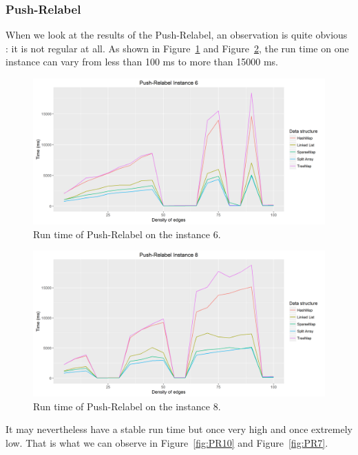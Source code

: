 \subsubsection{Push-Relabel}
When we look at the results of the Push-Relabel, an observation is quite obvious : it is not regular at all. As shown in Figure~\ref{fig:PR6} and Figure~\ref{fig:PR8}, the run time on one instance can vary from less than 100 ms to more than 15000 ms.

\begin{figure}[H]
\includegraphics[scale=0.5]{images/PR6.png}
\caption{Run time of Push-Relabel on the instance 6.}
\label{fig:PR6}
\end{figure}
\begin{figure}[H]
\includegraphics[scale=0.5]{images/PR8.png}
\caption{Run time of Push-Relabel on the instance 8.}
\label{fig:PR8}
\end{figure}

It may nevertheless have a stable run time but once very high and once extremely low. That is what we can observe in Figure~\ref{fig:PR10} and Figure~\ref{fig:PR7}.


